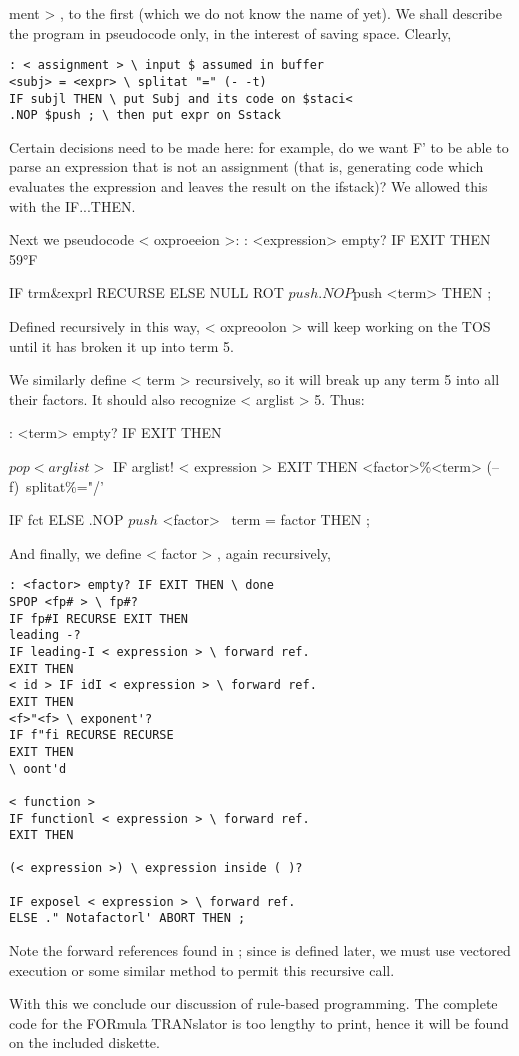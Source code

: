 ment > , to the first (which we do not know the name of yet).
We shall describe the program in pseudocode only, in the interest
of saving space. Clearly,

\begin{lstlisting}
: < assignment > \ input $ assumed in buffer
<subj> = <expr> \ splitat "=" (- -t)
IF subjl THEN \ put Subj and its code on $staci<
.NOP $push ; \ then put expr on Sstack
\end{lstlisting}

Certain decisions need to be made here: for example, do we want
F' to be able to parse an expression that is not an assignment (that
is, generating code which evaluates the expression and leaves the
result on the ifstack)? We allowed this with the IF...THEN.

Next we pseudocode < oxproeeion >:
: <expression> empty? IF EXIT THEN
59°F


IF trm\&exprl RECURSE
ELSE NULL ROT $push
.NOP $push <term>
THEN ;

Defined recursively in this way, < oxpreoolon > will keep
working on the TOS until it has broken it up into term 5.

We similarly define < term > recursively, so it will break up any
term 5 into all their factors. It should also recognize < arglist > 5.
Thus:

: <term> empty? IF EXIT THEN

$pop < arglist >$
IF arglist! < expression > EXIT THEN
<factor>\%<term> (--f)\ splitat\%="/'

IF fct%
ELSE .NOP $push$ <factor> \ term = factor
THEN ;

And finally, we define < factor > , again recursively,
\begin{lstlisting}
: <factor> empty? IF EXIT THEN \ done
SPOP <fp# > \ fp#?
IF fp#I RECURSE EXIT THEN
leading -?
IF leading-I < expression > \ forward ref.
EXIT THEN
< id > IF idI < expression > \ forward ref.
EXIT THEN
<f>"<f> \ exponent'?
IF f"fi RECURSE RECURSE
EXIT THEN
\ oont'd

< function >
IF functionl < expression > \ forward ref.
EXIT THEN

(< expression >) \ expression inside ( )?

IF exposel < expression > \ forward ref.
ELSE ." Notafactorl' ABORT THEN ;
\end{lstlisting}

\leftbar[1\linewidth]
Note the forward references found in ; since  is defined later, we must use vectored execution or some similar method to permit this recursive call.
\endleftbar

With this we conclude our discussion of rule-based programming. The complete code for the FORmula TRANslator is too lengthy to print, hence it will be found on the included diskette.